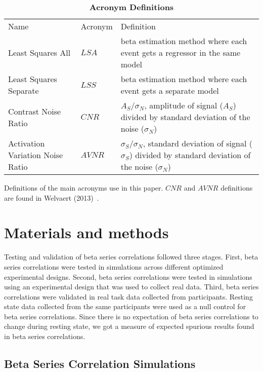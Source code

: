 \documentclass[10pt,letterpaper]{article}
\newlength\savedwidth
\newcommand\thickhline{\noalign{\global\savedwidth\arrayrulewidth\global\arrayrulewidth 2pt}%
\hline
\noalign{\global\arrayrulewidth\savedwidth}}
\begin{document}
\begin{table}[H]
  \begin{adjustwidth}{0in}{0in} %
  \centering
  \caption{
  {\bf Acronym Definitions}}
  \begin{tabular}{|l|l|p{60mm}|}
  \hline
  Name & Acronym & Definition\\ \thickhline
  Least Squares All & $LSA$ & beta estimation method where each event gets a regressor in the same model\\ \hline
  Least Squares Separate & $LSS$ & beta estimation method where each event gets a separate model\\ \hline
  Contrast Noise Ratio & $CNR$ & $A_S/\sigma_N$, amplitude of signal ($A_S$) divided by standard deviation of the noise ($\sigma_N$)\\ \hline
  Activation Variation Noise Ratio & $AVNR$ & $\sigma_S/\sigma_N$, standard deviation of signal ($\sigma_S$) divided by standard deviation of the noise ($\sigma_N$)\\ \hline
  \end{tabular}

  Definitions of the main acronyms use in this paper.
  $CNR$ and $AVNR$ definitions are found in Welvaert (2013)~\cite{Welvaert2013a}.
  \label{table0}
  \end{adjustwidth}
  \end{table}

\section*{Materials and methods}
\label{methods}

Testing and validation of beta series correlations followed three stages.
First, beta series correlations were tested in simulations across different
optimized experimental designs.
Second, beta series correlations were tested in simulations using an experimental
design that was used to collect real data.
Third, beta series correlations were validated in real task data collected from
participants.
Resting state data collected from the same participants were used as a null
control for beta series correlations.
Since there is no expectation of beta series correlations to change
during resting state, we got a measure of expected spurious results found
in beta series correlations.

\subsection*{Beta Series Correlation Simulations}
\label{methods:bsc-simulations}
\end{document}
